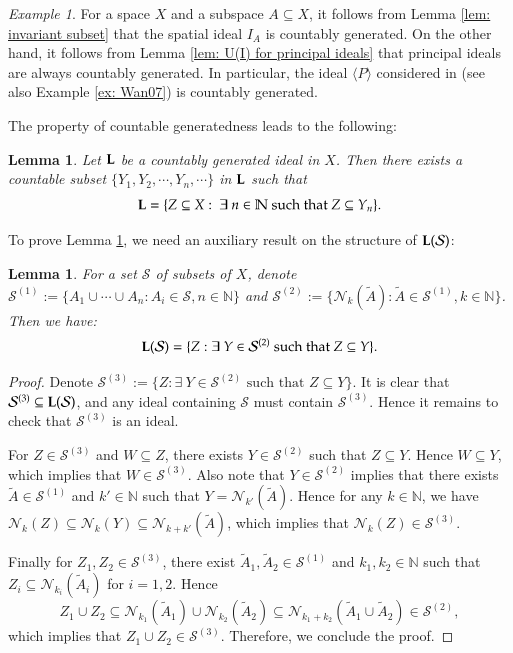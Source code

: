 \documentclass[12pt, a4paper]{amsart}
\numberwithin{equation}{section}
\newtheorem{lem}[thm]{Lemma}
\theoremstyle{definition}
\theoremstyle{remark}
\newtheorem{ex}[thm]{Example}
\def\NN{\mathbb{N}}
\def\L{\mathcal{L}}
\def\Nd{\mathcal{N}}
\def\S{\mathcal{S}}
\def\L{{\bf L}}
\begin{document}
\begin{ex}\label{ex:countably generated}
For a space $X$ and a subspace $A \subseteq X$, it follows from Lemma \ref{lem: invariant subset} that the spatial ideal $I_A$ is countably generated. On the other hand, it follows from Lemma \ref{lem: U(I) for principal ideals} that principal ideals are always countably generated. In particular, the ideal $\langle P \rangle$ considered in \cite[Section 3]{Wan07} (see also Example \ref{ex: Wan07}) is countably generated.
\end{ex}

The property of countable generatedness leads to the following:


\begin{lem}\label{lem:description of countably generated}
Let $\L$ be a countably generated ideal in $X$. Then there exists a countable subset $\{Y_1, Y_2, \cdots, Y_n, \cdots\}$ in $\L$ such that 
\[
\L=\{Z\subseteq X: ~\exists~n\in \NN \text{ such that } Z \subseteq Y_n\}.
\]
\end{lem}

To prove Lemma \ref{lem:description of countably generated}, we need an auxiliary result on the structure of $\L(\S)$:

\begin{lem}\label{lem:construction of ideals}
For a set $\S$ of subsets of $X$, denote $\S^{(1)}:=\{A_1 \cup \cdots \cup A_n: A_i \in \S, n\in \NN\}$ and $\S^{(2)}:=\{\Nd_k(\tilde{A}): \tilde{A} \in \S^{(1)}, k \in \NN\}$. Then we have:
\[
\L(\S) = \{Z: \exists~Y \in \S^{(2)} \text{ such that } Z \subseteq Y\}.
\]
\end{lem}

\begin{proof}
Denote $\S^{(3)}:=\{Z: \exists~Y \in \S^{(2)} \text{ such that } Z \subseteq Y\}$. It is clear that $\S^{(3)} \subseteq \L(\S)$, and any ideal containing $\S$ must contain $\S^{(3)}$. Hence it remains to check that $\S^{(3)}$ is an ideal.

For $Z \in \S^{(3)}$ and $W \subseteq Z$, there exists $Y \in \S^{(2)}$ such that $Z \subseteq Y$. Hence $W \subseteq Y$, which implies that $W \in \S^{(3)}$. Also note that $Y \in \S^{(2)}$ implies that there exists $\tilde{A} \in \S^{(1)}$ and $k'\in \NN$ such that $Y=\Nd_{k'}(\tilde{A})$. Hence for any $k\in \NN$, we have $\Nd_k(Z) \subseteq \Nd_k(Y) \subseteq \Nd_{k+k'}(\tilde{A})$, which implies that $\Nd_k(Z) \in \S^{(3)}$.

Finally for $Z_1, Z_2 \in \S^{(3)}$, there exist $\tilde{A}_1, \tilde{A}_2 \in \S^{(1)}$ and $k_1, k_2 \in \NN$ such that $Z_i \subseteq \Nd_{k_i}(\tilde{A}_i)$ for $i=1,2$. Hence 
\[
Z_1 \cup Z_2 \subseteq \Nd_{k_1}(\tilde{A}_1) \cup \Nd_{k_2}(\tilde{A}_2) \subseteq \Nd_{k_1 + k_2}(\tilde{A}_1 \cup \tilde{A}_2) \in \S^{(2)},
\]
which implies that $Z_1 \cup Z_2 \in \S^{(3)}$. Therefore, we conclude the proof.
\end{proof}
\end{document}
